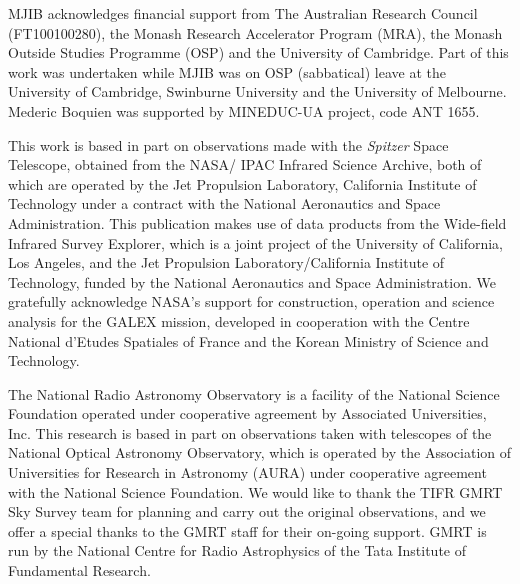 \documentclass[preprint]{aastex61}
\begin{document}
\begin{acknowledgments}


MJIB acknowledges financial support from The Australian Research Council (FT100100280), the Monash Research Accelerator Program (MRA), the Monash Outside Studies Programme (OSP) and the University of Cambridge. Part of this work was undertaken while MJIB was on OSP (sabbatical) leave at the University of Cambridge, Swinburne University and the University of Melbourne. Mederic Boquien was supported by MINEDUC-UA project, code ANT 1655.

This work is based in part on observations made with the {\it Spitzer} Space Telescope, obtained from the NASA/ IPAC Infrared Science Archive, both of which are operated by the Jet Propulsion Laboratory, California Institute of Technology under a contract with the National Aeronautics and Space Administration. This publication makes use of data products from the Wide-field Infrared Survey Explorer, which is a joint project of the University of California, Los Angeles, and the Jet Propulsion Laboratory/California Institute of Technology, funded by the National Aeronautics and Space Administration. We gratefully acknowledge NASA's support for construction, operation and science analysis for the GALEX mission, developed in cooperation with the Centre National d'Etudes Spatiales of France and the Korean Ministry of Science and Technology. 

The National Radio Astronomy Observatory is a facility of the National Science Foundation operated under cooperative agreement by Associated Universities, Inc. This research is based in part on observations taken with telescopes of the National Optical Astronomy Observatory, which is operated by the Association of Universities for Research in Astronomy (AURA) under cooperative agreement with the National Science Foundation.  We would like to thank the TIFR GMRT Sky Survey team for planning and carry out the original observations, and we offer a special thanks to the GMRT staff for their on-going support. GMRT is run by the National Centre for Radio Astrophysics of the Tata Institute of Fundamental Research. 


\end{acknowledgments}
\end{document}
